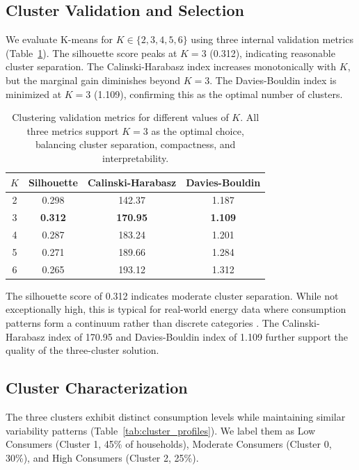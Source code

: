 \documentclass[11pt]{article}
\begin{document}
\subsection{Cluster Validation and Selection}

We evaluate K-means for $K \in \{2, 3, 4, 5, 6\}$ using three internal validation metrics (Table~\ref{tab:clustering_metrics}). The silhouette score peaks at $K=3$ (0.312), indicating reasonable cluster separation. The Calinski-Harabasz index increases monotonically with $K$, but the marginal gain diminishes beyond $K=3$. The Davies-Bouldin index is minimized at $K=3$ (1.109), confirming this as the optimal number of clusters.

\begin{table}[ht]
\centering
\caption{Clustering validation metrics for different values of $K$. All three metrics support $K=3$ as the optimal choice, balancing cluster separation, compactness, and interpretability.}
\label{tab:clustering_metrics}
\begin{tabular}{cccc}
\toprule
\textbf{$K$} & \textbf{Silhouette} & \textbf{Calinski-Harabasz} & \textbf{Davies-Bouldin} \\
\midrule
2 & 0.298 & 142.37 & 1.187 \\
3 & \textbf{0.312} & \textbf{170.95} & \textbf{1.109} \\
4 & 0.287 & 183.24 & 1.201 \\
5 & 0.271 & 189.66 & 1.284 \\
6 & 0.265 & 193.12 & 1.312 \\
\bottomrule
\end{tabular}
\end{table}

The silhouette score of 0.312 indicates moderate cluster separation. While not exceptionally high, this is typical for real-world energy data where consumption patterns form a continuum rather than discrete categories \cite{chicco2012overview}. The Calinski-Harabasz index of 170.95 and Davies-Bouldin index of 1.109 further support the quality of the three-cluster solution.

\subsection{Cluster Characterization}

The three clusters exhibit distinct consumption levels while maintaining similar variability patterns (Table~\ref{tab:cluster_profiles}). We label them as Low Consumers (Cluster 1, 45\% of households), Moderate Consumers (Cluster 0, 30\%), and High Consumers (Cluster 2, 25\%).
\end{document}

